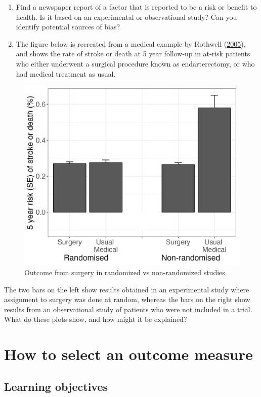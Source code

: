 \documentclass{krantz}
\begin{document}
\begin{enumerate}
\def\labelenumi{\arabic{enumi}.}
\item
  Find a newspaper report of a factor that is reported to be a risk or benefit to health. Is it based on an experimental or observational study? Can you identify potential sources of bias?
\item
  The figure below is recreated from a medical example by Rothwell (\protect\hyperlink{ref-rothwell2005}{2005}), and shows the rate of stroke or death at 5 year follow-up in at-risk patients who either underwent a surgical procedure known as endarterectomy, or who had medical treatment as usual.
\end{enumerate}

\begin{figure}

{\centering \includegraphics[width=0.5\linewidth,height=0.5\textheight]{images_bw/rothwellplot} 

}

\caption{Outcome from surgery in randomized vs non-randomized studies}\label{fig:rothwellfig}
\end{figure}

The two bars on the left show results obtained in an experimental study where assignment to surgery was done at random, whereas the bars on the right show results from an observational study of patients who were not included in a trial. What do these plots show, and how might it be explained?

\hypertarget{reliability}{%
\chapter{How to select an outcome measure}\label{reliability}}

\hypertarget{learning-objectives-2}{%
\section{Learning objectives}\label{learning-objectives-2}}
\end{document}
